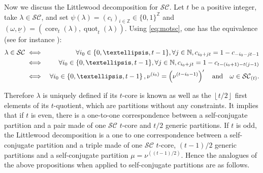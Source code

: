 \documentclass[11pt,letterpaper]{amsart}
\def\bbbz{\mathbb Z}
\def\ccsc{\mathcal {SC}}
\DeclareMathOperator{\core}{core}
\DeclareMathOperator{\quot}{quot}
\numberwithin{equation}{section}
\numberwithin{df}{section}
\begin{document}
Now we discuss the Littlewood decomposition for $\ccsc$. Let $t$ be a positive integer, take $\lambda\in \ccsc$, and set $\psi(\lambda)=(c_i)_{i \in\mathbb{Z}}\in \lbrace 0,1\rbrace^\bbbz$ and $(\omega,\underline{\nu})=\left(\core_t(\lambda),\quot_t(\lambda)\right)$. Using \eqref{eq:motsc}, one has the equivalence  (see for instance \cite{GKS,Pe}):
\begin{eqnarray}
\lambda\in \ccsc &\iff & \forall i_0 \in \lbrace 0,\ldots,t-1\rbrace,\forall j \in \mathbb{N},c_{i_0+jt}=1-c_{-i_0-jt-1}\notag\\
&\iff & \forall i_0 \in \lbrace 0,\ldots,t-1\rbrace,\forall j \in \mathbb{N},c_{i_0+jt}=1-c_{t-(i_0+1)-t(j-1)}\label{mot}\notag\\
&\iff &\forall i_0 \in \left\lbrace 0,\ldots,t-1 \right\rbrace, \nu^{(i_0)}=\left(\nu^{(t-i_0-1)}\right)'\quad \text{and}\quad \omega \in \ccsc_{(t)}\notag .\end{eqnarray}

Therefore $\lambda$ is uniquely defined if its $t$-core is known as well as the $\left\lfloor t/2\right\rfloor$ first elements of its $t$-quotient, which are partitions without any constraints. It implies that if $t$ is even, there is a one-to-one correspondence between a self-conjugate partition and a pair made of one $\ccsc$ $t$-core and $t/2$ generic partitions. If $t$ is odd, the Littlewood decomposition is a one to one correspondence between a self-conjugate partition and a triple made of one $\ccsc$ $t$-core, $(t-1)/2$ generic partitions and a self-conjugate partition $\mu=\nu^{((t-1)/2)}$.
Hence the analogues of the above propositions when applied to self-conjugate partitions are as follows.
\end{document}
